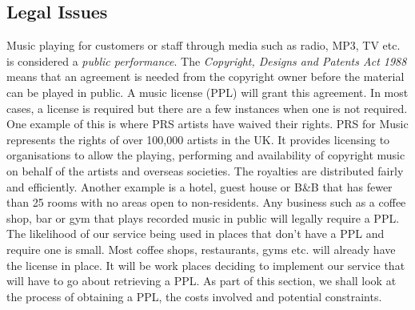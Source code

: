\subsection{\textbf{Legal Issues}}
    Music playing for customers or staff through media such as radio, MP3, TV etc. is considered a \emph{public performance}. The \emph{Copyright, Designs and Patents Act 1988} means that an agreement is needed from the copyright owner before the material can be played in public. A music license (PPL) will grant this agreement. In most cases, a license is required but there are a few instances when one is not required. One example of this is where PRS  artists have waived their rights. PRS for Music represents the rights of over 100,000 artists in the UK.  It provides licensing to organisations to allow the playing, performing and availability of copyright music on behalf of the artists and overseas societies.  The royalties are distributed fairly and efficiently.  Another example is a hotel, guest house or B\&B that has fewer than 25 rooms with no areas open to non-residents. 
    Any business such as a coffee shop, bar or gym that plays recorded music in public will legally require a PPL. The likelihood of our service being used in places that don't have a PPL and require one is small. Most coffee shops, restaurants, gyms etc. will already have the license in place. It will be work places deciding to implement our service that will have to go about retrieving a PPL. As part of this section, we shall look at the process of obtaining a PPL, the costs involved and potential constraints.